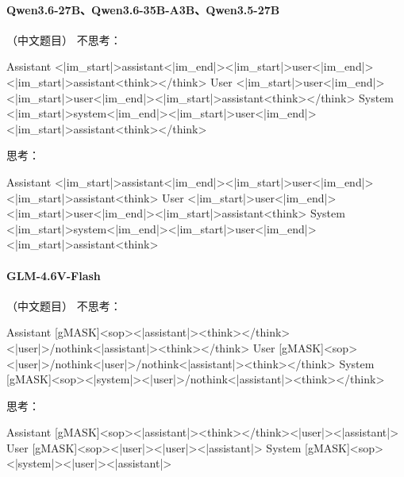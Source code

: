 \paragraph{Qwen3.6-27B、Qwen3.6-35B-A3B、Qwen3.5-27B} （中文题目）
\noindent 不思考：
\begin{Rendering}
Assistant  <|im_start|>assistant\NL{}<|im_end|>\NL{}<|im_start|>user\NL{}<|im_end|>\NL{}<|im_start|>assistant\NL{}<think>\NL{}\NL{}</think>\NL{}\NL{}
User       <|im_start|>user\NL{}<|im_end|>\NL{}<|im_start|>user\NL{}<|im_end|>\NL{}<|im_start|>assistant\NL{}<think>\NL{}\NL{}</think>\NL{}\NL{}
System     <|im_start|>system\NL{}<|im_end|>\NL{}<|im_start|>user\NL{}<|im_end|>\NL{}<|im_start|>assistant\NL{}<think>\NL{}\NL{}</think>\NL{}\NL{}
\end{Rendering}
\noindent 思考：
\begin{Rendering}
Assistant  <|im_start|>assistant\NL{}<|im_end|>\NL{}<|im_start|>user\NL{}<|im_end|>\NL{}<|im_start|>assistant\NL{}<think>\NL{}
User       <|im_start|>user\NL{}<|im_end|>\NL{}<|im_start|>user\NL{}<|im_end|>\NL{}<|im_start|>assistant\NL{}<think>\NL{}
System     <|im_start|>system\NL{}<|im_end|>\NL{}<|im_start|>user\NL{}<|im_end|>\NL{}<|im_start|>assistant\NL{}<think>\NL{}
\end{Rendering}
\paragraph{GLM-4.6V-Flash} （中文题目）
\noindent 不思考：
\begin{Rendering}
Assistant  [gMASK]<sop><|assistant|>\NL{}<think></think>\NL{}<|user|>\NL{}/nothink<|assistant|>\NL{}<think></think>\NL{}
User       [gMASK]<sop><|user|>\NL{}/nothink<|user|>\NL{}/nothink<|assistant|>\NL{}<think></think>\NL{}
System     [gMASK]<sop><|system|>\NL{}<|user|>\NL{}/nothink<|assistant|>\NL{}<think></think>\NL{}
\end{Rendering}
\noindent 思考：
\begin{Rendering}
Assistant  [gMASK]<sop><|assistant|>\NL{}<think></think>\NL{}<|user|>\NL{}<|assistant|>\NL{}
User       [gMASK]<sop><|user|>\NL{}<|user|>\NL{}<|assistant|>\NL{}
System     [gMASK]<sop><|system|>\NL{}<|user|>\NL{}<|assistant|>\NL{}
\end{Rendering}
